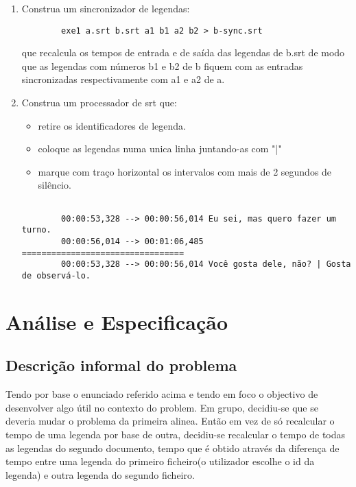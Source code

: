 \documentclass{report}
\begin{document}
\begin{enumerate}[1.]
    \item Construa um sincronizador de legendas:
        \begin{verbatim}
        exe1 a.srt b.srt a1 b1 a2 b2 > b-sync.srt
        \end{verbatim}
        que recalcula os tempos de entrada e de saída das legendas de b.srt de modo que as legendas com números b1 e b2 de b fiquem com as entradas sincronizadas respectivamente com a1 e a2 de a.

    \item Construa um processador de srt que:
        \begin{itemize}
            \item retire os identificadores de legenda.
            \item coloque as legendas numa unica linha juntando-as com "|"
            \item marque com traço horizontal os intervalos com mais de 2 segundos de silêncio.
        \end{itemize}
        \begin{verbatim}

        00:00:53,328 --> 00:00:56,014 Eu sei, mas quero fazer um turno.
        00:00:56,014 --> 00:01:06,485 =================================
        00:00:53,328 --> 00:00:56,014 Você gosta dele, não? | Gosta de observá-lo.
        \end{verbatim}
\end{enumerate}

\chapter{Análise e Especificação} \label{ae}

\section{Descrição informal do problema}
Tendo por base o enunciado referido acima e tendo em foco o objectivo de desenvolver algo útil no contexto do problem. Em grupo, decidiu-se que se deveria mudar o problema da primeira alinea.
Então em vez de só recalcular o tempo de uma legenda por base de outra, decidiu-se recalcular o tempo de todas as legendas do segundo documento, tempo que é obtido através da diferença de tempo entre uma legenda do primeiro ficheiro(o utilizador escolhe o id da legenda) e outra legenda do segundo ficheiro.
\end{document}
